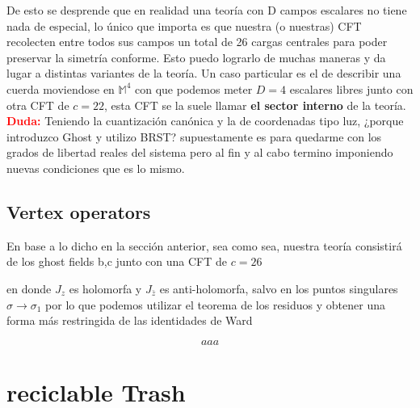 \documentclass[]{article}
\begin{document}
De esto se desprende que en realidad una teoría con D campos escalares no tiene nada de especial, lo único que importa es que nuestra (o nuestras) CFT recolecten entre todos sus campos un total de 26 cargas centrales para poder preservar la simetría conforme. Esto puedo lograrlo de muchas maneras y da lugar a distintas variantes de la teoría. Un caso particular es el de describir una cuerda moviendose en $ \mathbb{M}^4 $ con que podemos meter $ D=4 $ escalares libres junto con otra CFT de $ c=22 $, esta CFT se la suele llamar \textbf{el sector interno} de la teoría.\\

\textcolor{red}{\textbf{Duda:}} Teniendo la cuantización canónica y la de coordenadas tipo luz, ¿porque introduzco Ghost y utilizo BRST? supuestamente es para quedarme con los grados de libertad reales del sistema pero al fin y al cabo termino imponiendo nuevas condiciones que es lo mismo.
\subsection*{Vertex operators}

En base a lo dicho en la sección anterior, sea como sea, nuestra teoría consistirá de los ghost fields b,c junto con una CFT de $ c=26 $



en donde $ J_z $ es holomorfa y $ J_{\bar{z}} $ es anti-holomorfa, salvo en los puntos singulares $ \sigma \rightarrow \sigma_1 $ por lo que podemos utilizar el teorema de los residuos y obtener una forma más restringida de las identidades de Ward

\begin{equation}\label{key}
aaa
\end{equation}



\section{reciclable Trash}
\end{document}
